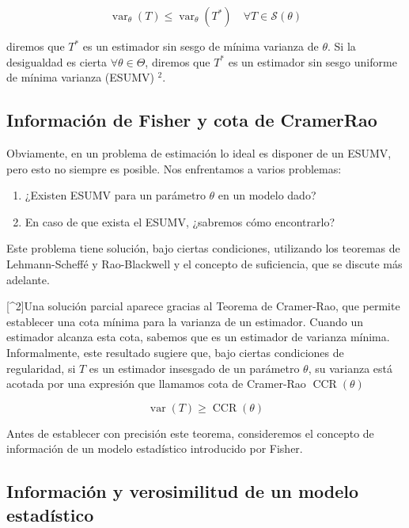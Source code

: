 \documentclass[
]{article}
\providecommand{\tightlist}{%
  \setlength{\itemsep}{0pt}\setlength{\parskip}{0pt}}
\begin{document}
\[
\operatorname{var}_{\theta}(T) \leq \operatorname{var}_{\theta}\left(T^{*}\right) \quad \forall T \in \mathcal{S}(\theta)
\]

diremos que \(T^{*}\) es un estimador sin sesgo de mínima varianza de \(\theta\). Si la desigualdad es cierta \(\forall \theta \in \Theta\), diremos que \(T^{*}\) es un estimador sin sesgo uniforme de mínima varianza (ESUMV) \({ }^{2}\).

\subsection{Información de Fisher y cota de CramerRao}\label{informaciuxf3n-de-fisher-y-cota-de-cramerrao}

Obviamente, en un problema de estimación lo ideal es disponer de un ESUMV, pero esto no siempre es posible. Nos enfrentamos a varios problemas:

\begin{enumerate}
\def\labelenumi{\arabic{enumi}.}
\tightlist
\item
  ¿Existen ESUMV para un parámetro \(\theta\) en un modelo dado?
\item
  En caso de que exista el ESUMV, ¿sabremos cómo encontrarlo?
\end{enumerate}

Este problema tiene solución, bajo ciertas condiciones, utilizando los teoremas de Lehmann-Scheffé y Rao-Blackwell y el concepto de suficiencia, que se discute más adelante.

{[}\^{}2{]}Una solución parcial aparece gracias al Teorema de Cramer-Rao, que permite establecer una cota mínima para la varianza de un estimador. Cuando un estimador alcanza esta cota, sabemos que es un estimador de varianza mínima.
Informalmente, este resultado sugiere que, bajo ciertas condiciones de regularidad, si \(T\) es un estimador insesgado de un parámetro \(\theta\), su varianza está acotada por una expresión que llamamos cota de Cramer-Rao \(\operatorname{CCR}(\theta)\)

\[
\operatorname{var}(T) \geq \operatorname{CCR}(\theta)
\]

Antes de establecer con precisión este teorema, consideremos el concepto de información de un modelo estadístico introducido por Fisher.

\subsection{Información y verosimilitud de un modelo estadístico}\label{informaciuxf3n-y-verosimilitud-de-un-modelo-estaduxedstico}
\end{document}

